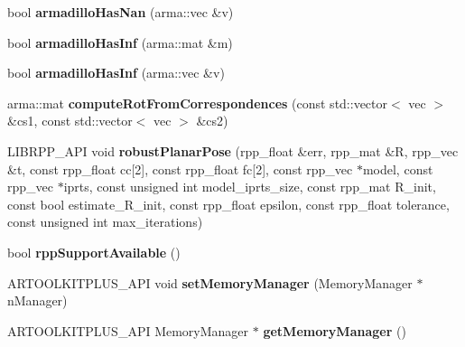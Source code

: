 \begin{DoxyCompactItemize}
\item 
bool {\bfseries armadillo\+Has\+Nan} (arma\+::vec \&v)\hypertarget{namespacekukadu_ad94144c2d74dfc73ab0560cb46aeae50}{}\label{namespacekukadu_ad94144c2d74dfc73ab0560cb46aeae50}

\item 
bool {\bfseries armadillo\+Has\+Inf} (arma\+::mat \&m)\hypertarget{namespacekukadu_a1c39aba2de4bafc472bde56520a7a822}{}\label{namespacekukadu_a1c39aba2de4bafc472bde56520a7a822}

\item 
bool {\bfseries armadillo\+Has\+Inf} (arma\+::vec \&v)\hypertarget{namespacekukadu_ae06f7d994557485abbf95e7984496406}{}\label{namespacekukadu_ae06f7d994557485abbf95e7984496406}

\item 
arma\+::mat {\bfseries compute\+Rot\+From\+Correspondences} (const std\+::vector$<$ vec $>$ \&cs1, const std\+::vector$<$ vec $>$ \&cs2)\hypertarget{namespacekukadu_a16aaa18e5828f7f41bafd3f459dc7ff6}{}\label{namespacekukadu_a16aaa18e5828f7f41bafd3f459dc7ff6}

\item 
L\+I\+B\+R\+P\+P\+\_\+\+A\+PI void {\bfseries robust\+Planar\+Pose} (rpp\+\_\+float \&err, rpp\+\_\+mat \&R, rpp\+\_\+vec \&t, const rpp\+\_\+float cc\mbox{[}2\mbox{]}, const rpp\+\_\+float fc\mbox{[}2\mbox{]}, const rpp\+\_\+vec $\ast$model, const rpp\+\_\+vec $\ast$iprts, const unsigned int model\+\_\+iprts\+\_\+size, const rpp\+\_\+mat R\+\_\+init, const bool estimate\+\_\+\+R\+\_\+init, const rpp\+\_\+float epsilon, const rpp\+\_\+float tolerance, const unsigned int max\+\_\+iterations)\hypertarget{namespacekukadu_a0cdcc992eb36ce10d72e2126133decaf}{}\label{namespacekukadu_a0cdcc992eb36ce10d72e2126133decaf}

\item 
bool {\bfseries rpp\+Support\+Available} ()\hypertarget{namespacekukadu_ac24074bbaa6e087e97d7cb90cc3d0cab}{}\label{namespacekukadu_ac24074bbaa6e087e97d7cb90cc3d0cab}

\item 
A\+R\+T\+O\+O\+L\+K\+I\+T\+P\+L\+U\+S\+\_\+\+A\+PI void {\bfseries set\+Memory\+Manager} (Memory\+Manager $\ast$n\+Manager)\hypertarget{namespacekukadu_a2bdf6f0082bf89b9a19495a411328128}{}\label{namespacekukadu_a2bdf6f0082bf89b9a19495a411328128}

\item 
A\+R\+T\+O\+O\+L\+K\+I\+T\+P\+L\+U\+S\+\_\+\+A\+PI Memory\+Manager $\ast$ {\bfseries get\+Memory\+Manager} ()\hypertarget{namespacekukadu_a3de0dce463c8f2cb1232e28b44fc831c}{}\label{namespacekukadu_a3de0dce463c8f2cb1232e28b44fc831c}


\end{DoxyCompactItemize}
